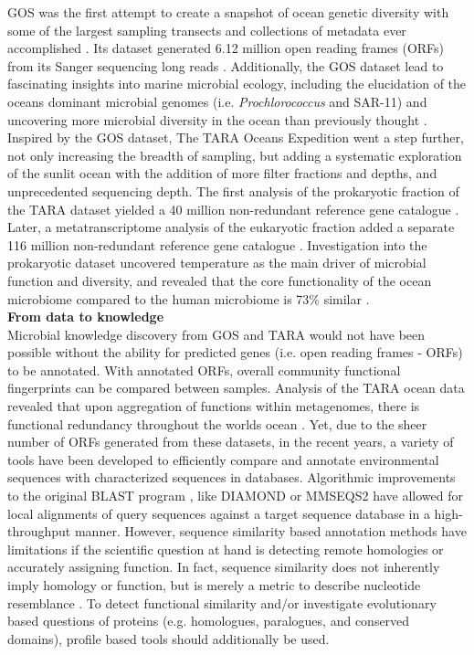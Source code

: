 GOS was the first attempt to create a snapshot of ocean genetic diversity with some of the largest sampling transects and collections of metadata ever accomplished \citep{Rusch_2007}. Its dataset generated 6.12 million open reading frames (ORFs) from its Sanger sequencing long reads \citep{Yooseph_2007}. Additionally, the GOS dataset lead to fascinating insights into marine microbial ecology, including the elucidation of the ocean\textquotesingle s dominant microbial genomes (i.e. \textit{Prochlorococcus} and SAR-11) and uncovering more microbial diversity in the ocean than previously thought \citep{Nealson_2007, Venter_2004, Rusch_2007, Yooseph_2007}.\\

Inspired by the GOS dataset, The TARA Oceans Expedition went a step further, not only increasing the breadth of sampling, but adding a systematic exploration of the sunlit ocean with the addition of more filter fractions and depths, and unprecedented sequencing depth. The first analysis of the prokaryotic fraction of the TARA dataset yielded a 40 million non-redundant reference gene catalogue \citep{Sunagawa_2015}. Later, a metatranscriptome analysis of the eukaryotic fraction added a separate 116 million non-redundant reference gene catalogue \citep{Carradec_2018}. Investigation into the prokaryotic dataset uncovered temperature as the main driver of microbial function and diversity, and revealed that the core functionality of the ocean microbiome compared to the human microbiome is 73\% similar \citep{Sunagawa_2015}.\\

\textbf{From data to knowledge}\\

Microbial knowledge discovery from GOS and TARA would not have been possible without the ability for predicted genes (i.e. open reading frames - ORFs) to be annotated. With annotated ORFs, overall community functional fingerprints can be compared between samples. Analysis of the TARA ocean data revealed that upon aggregation of functions within metagenomes, there is functional redundancy throughout the world\textquotesingle s ocean \citep{Louca_2016}. Yet, due to the sheer number of ORFs generated from these datasets, in the recent years, a variety of tools have been developed to efficiently compare and annotate environmental sequences with characterized sequences in databases. Algorithmic improvements to the original BLAST program \citep{Altschul_1990}, like DIAMOND \citep{Buchfink_2014} or MMSEQS2 \citep{Steinegger_2017} have allowed for local alignments of query sequences against a target sequence database in a high-throughput manner. However, sequence similarity based annotation methods have limitations if the scientific question at hand is detecting remote homologies or accurately assigning function. In fact, sequence similarity does not inherently imply homology or function, but is merely a metric to describe nucleotide resemblance \citep{States_1991}. To detect functional similarity and/or investigate evolutionary based questions of proteins (e.g. homologues, paralogues, and conserved domains), profile based tools should additionally be used.\\

